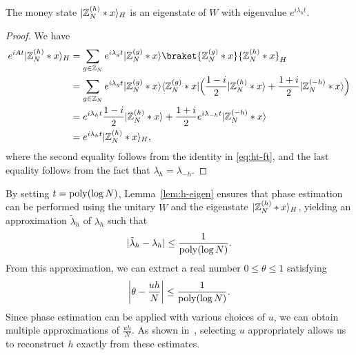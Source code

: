 \documentclass[11pt]{article}
\theoremstyle{definition}
\begin{document}
\begin{lemma}
    \label{lem:h-eigen}
    The money state $\ket{\Z_N^{(h)} * x}_H$ is an eigenstate of $W$ with eigenvalue $e^{i\lambda_h t}$.
\end{lemma}
\begin{proof}
    We have 
    \begin{align*}
        e^{iAt} \ket{\Z_N^{(h)} * x}_H
        & = \sum_{g \in \Z_N} e^{i\lambda_gt} \ket{\Z_N^{(g)} * x} \braket{\Z_N^{(g)} * x}{\Z_N^{(h)} * x}_H \\
        & = \sum_{g \in \Z_N} e^{i\lambda_gt} \ket{\Z_N^{(g)} * x} \bra{\Z_N^{(g)} * x} \Big( \frac{1 - i}{2} \ket{\Z_N^{(h)} * x} + \frac{1 + i}{2} \ket{\Z_N^{(-h)} * x} \Big) \\
        & = e^{i\lambda_{h}t} \frac{1 - i}{2} \ket{\Z_N^{(h)} * x} + \frac{1 + i}{2} e^{i\lambda_{-h}t} \ket{\Z_N^{(-h)} * x} \\
        & = e^{i\lambda_{h}t} \ket{\Z_N^{(h)} * x}_H,
    \end{align*}
    where the second equality follows from the identity in \eqref{eq:ht-ft}, and the last equality follows from the fact that $\lambda_h = \lambda_{-h}$.
\end{proof}


By setting \( t = \poly(\log N) \), Lemma~\ref{lem:h-eigen} ensures that phase estimation can be performed using the unitary \( W \) and the eigenstate \( \ket{\Z_N^{(h)} * x}_H \), yielding an approximation \( \tilde{\lambda}_h \) of \( \lambda_h \) such that
\[
\abs{\tilde{\lambda}_h - \lambda_h} \le \frac{1}{\poly(\log N)}.
\]
From this approximation, we can extract a real number \( 0 \le \theta \le 1 \) satisfying
\[
\abs*{\theta - \frac{uh}{N}} \le \frac{1}{\poly(\log N)}.
\]
Since phase estimation can be applied with various choices of \( u \), we can obtain multiple approximations of \( \frac{uh}{N} \). As shown in~\cite{zhandry2024quantum}, selecting \( u \) appropriately allows us to reconstruct \( h \) exactly from these estimates.










\newpage


\end{document}
